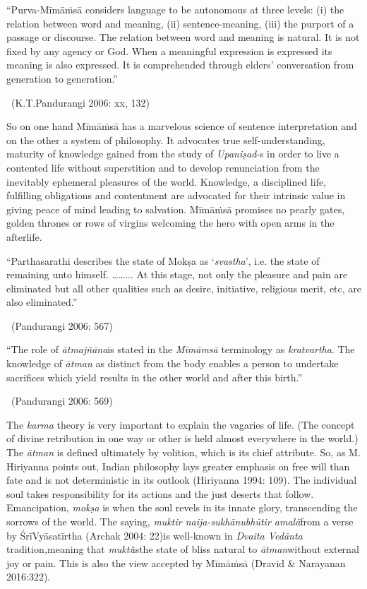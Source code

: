 \begin{myquote}
“Purva-Mīmāṁsā considers language to be autonomous at three levels: (i) the relation between word and meaning, (ii) sentence-meaning, (iii) the purport of a passage or discourse. The relation between word and meaning is natural. It is not fixed by any agency or God. When a meaningful expression is expressed its meaning is also expressed. It is comprehended through elders’ conversation from generation to generation.” 

~\hfill (K.T.Pandurangi 2006: xx, 132)
\end{myquote}

So on one hand Mīmāṁsā has a marvelous science of sentence interpretation and on the other a system of philosophy. It advocates true self-understanding, maturity of knowledge gained from the study of \textit{Upaniṣad}-s in order to live a contented life without superstition and to develop renunciation from the inevitably ephemeral pleasures of the world. Knowledge, a disciplined life, fulfilling obligations and contentment are advocated for their intrinsic value in giving peace of mind leading to salvation. Mīmāṁsā promises no pearly gates, golden thrones or rows of virgins welcoming the hero with open arms in the afterlife.

\begin{myquote}
“Parthasarathi describes the state of Mokṣa as ‘\textit{svastha}’, i.e. the state of remaining unto himself. ……... At this stage, not only the pleasure and pain are eliminated but all other qualities such as desire, initiative, religious merit, etc, are also eliminated.” 

~\hfill (Pandurangi 2006: 567)
\end{myquote}

\begin{myquote}
“The role of \textit{ātmajñāna}is stated in the\textit{ Mīmāmsā} terminology as \textit{kratvartha}. The knowledge of \textit{ātman} as distinct from the body enables a person to undertake sacrifices which yield results in the other world and after this birth.” 

~\hfill (Pandurangi 2006: 569)
\end{myquote}

The \textit{karma} theory is very important to explain the vagaries of life. (The concept of divine retribution in one way or other is held almost everywhere in the world.) The \textit{ātman} is defined ultimately by volition, which is its chief attribute. So, as M. Hiriyanna points out, Indian philosophy lays greater emphasis on free will than fate and is not deterministic in its outlook (Hiriyanna 1994: 109). The individual soul takes responsibility for its actions and the just deserts that follow. Emancipation, \textit{mokṣa} is when the soul revels in its innate glory, transcending the sorrows of the world. The saying, \textit{muktir naija-sukhānubhūtir amalā}from a verse by ŚrīVyāsatīrtha (Archak 2004: 22)is well-known in \textit{Dvaita Vedānta} tradition\textit{,}meaning that\textit{ mukti}isthe state of bliss natural to\textit{ ātman}without external joy or pain. This is also the view accepted by Mīmāṁsā (Dravid \& Narayanan 2016:322).


